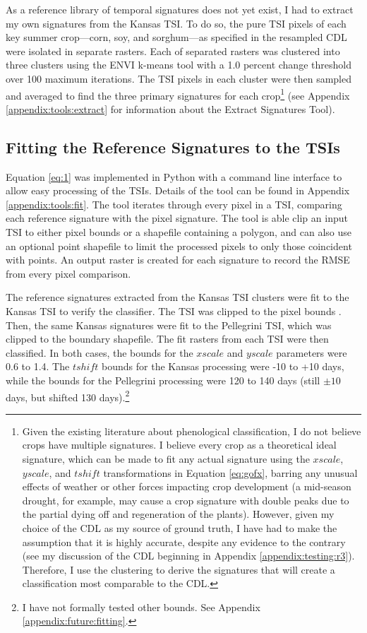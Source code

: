 As a reference library of temporal signatures does not yet exist, I had to extract my own signatures from the Kansas TSI. To do so, the pure TSI pixels of each key summer crop---corn, soy, and sorghum---as specified in the resampled CDL were isolated in separate rasters. Each of separated rasters was clustered into three clusters using the ENVI  k-means tool with a 1.0 percent change threshold over 100 maximum iterations. The TSI pixels in each cluster were then sampled and averaged to find the three primary signatures for each crop\footnote{Given the existing literature about phenological classification, I do not believe crops have multiple signatures. I believe every crop as a theoretical ideal signature, which can be made to fit any actual signature using the $xscale$, $yscale$, and $tshift$ transformations in Equation \ref{eq:gofx}, barring any unusual effects of weather or other forces impacting crop development (a mid-season drought, for example, may cause a crop signature with double peaks due to the partial dying off and regeneration of the plants). However, given my choice of the CDL as my source of ground truth, I have had to make the assumption that it is highly accurate, despite any evidence to the contrary (see my discussion of the CDL beginning in Appendix \ref{appendix:testing:r3}). Therefore, I use the clustering to derive the signatures that will create a classification most comparable to the CDL.} (see Appendix \ref{appendix:tools:extract} for information about the Extract Signatures Tool).

\subsection{Fitting the Reference Signatures to the TSIs}

Equation \ref{eq:1} was implemented in Python with a command line interface to allow easy processing of the TSIs. Details of the tool can be found in Appendix \ref{appendix:tools:fit}. The tool iterates through every pixel in a TSI, comparing each reference signature with the pixel signature. The tool is able clip an input TSI to either pixel bounds or a shapefile containing a polygon, and can also use an optional point shapefile to limit the processed pixels to only those coincident with points. An output raster is created for each signature to record the RMSE from every pixel comparison.

The reference signatures extracted from the Kansas TSI clusters were fit to the Kansas TSI to verify the classifier. The TSI was clipped to the pixel bounds . Then, the same Kansas signatures were fit to the Pellegrini TSI, which was clipped to the boundary shapefile. The fit rasters from each TSI were then classified. In both cases, the bounds for the $xscale$ and $yscale$ parameters were 0.6 to 1.4. The $tshift$ bounds for the Kansas processing were -10 to +10 days, while the bounds for the Pellegrini processing were 120 to 140 days (still $\pm10$ days, but shifted 130 days).\footnote{I have not formally tested other bounds. See Appendix \ref{appendix:future:fitting}.}

